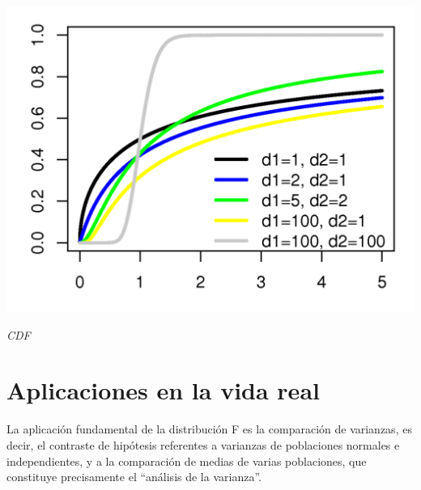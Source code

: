 \begin{center}
	\includegraphics[scale=1.5]{imgs/f-cdf.png}
	
	\textit{CDF}
\end{center}

\section{Aplicaciones en la vida real}
La aplicación fundamental de la distribución F es la comparación de varianzas, es decir, el contraste de hipótesis referentes a varianzas de poblaciones normales e independientes, y a la comparación de medias de varias poblaciones, que constituye precisamente el “análisis de la varianza”.